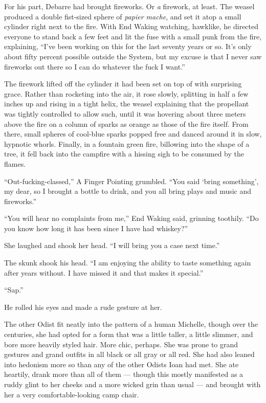 For his part, Debarre had brought fireworks. Or \emph{a} firework, at least. The weasel produced a double fist-sized sphere of \emph{papier mache}, and set it atop a small cylinder right next to the fire. With End Waking watching, hawklike, he directed everyone to stand back a few feet and lit the fuse with a small punk from the fire, explaining, ``I've been working on this for the last seventy years or so. It's only about fifty percent possible outside the System, but my excuse is that I never saw fireworks out there so I can do whatever the fuck I want.''

The firework lifted off the cylinder it had been set on top of with surprising grace. Rather than rocketing into the air, it rose slowly, splitting in half a few inches up and rising in a tight helix, the weasel explaining that the propellant was tightly controlled to allow such, until it was hovering about three meters above the fire on a column of sparks as orange as those of the fire itself. From there, small spheres of cool-blue sparks popped free and danced around it in slow, hypnotic whorls. Finally, in a fountain green fire, billowing into the shape of a tree, it fell back into the campfire with a hissing sigh to be consumed by the flames.

``Out-fucking-classed,'' A Finger Pointing grumbled. ``You said `bring something', my dear, so I brought a bottle to drink, and you all bring plays and music and fireworks.''

``You will hear no complaints from me,'' End Waking said, grinning toothily. ``Do you know how long it has been since I have had whiskey?''

She laughed and shook her head. ``I will bring you a case next time.''

The skunk shook his head. ``I am enjoying the ability to taste something again after years without. I have missed it and that makes it special.''

``Sap.''

He rolled his eyes and made a rude gesture at her.

The other Odist fit neatly into the pattern of a human Michelle, though over the centuries, she had opted for a form that was a little taller, a little slimmer, and bore more heavily styled hair. More chic, perhaps. She was prone to grand gestures and grand outfits in all black or all gray or all red. She had also leaned into hedonism more so than any of the other Odists Ioan had met. She ate heartily, drank more than all of them — though this mostly manifested as a ruddy glint to her cheeks and a more wicked grin than usual — and brought with her a very comfortable-looking camp chair.

